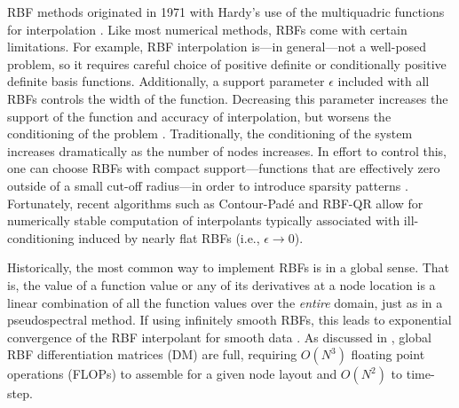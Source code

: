 RBF methods originated in 1971 with Hardy's use of the multiquadric functions for interpolation \cite{Hardy1971}. Like most numerical methods, RBFs come with certain
limitations. For example, RBF interpolation is---in general---not a well-posed
problem, so it requires careful choice of positive definite or conditionally
positive definite basis functions. %
Additionally, a support parameter $\epsilon$ included with all RBFs controls the width of the function. Decreasing this parameter increases the support of the function and accuracy of interpolation, but worsens the conditioning of the problem \cite{Schaback1995}. Traditionally, the conditioning of the system increases dramatically as the number of
nodes increases. In effort to control this, one can choose RBFs with
compact support---functions that are effectively zero outside of a small
cut-off radius---in order to introduce sparsity patterns \cite{Fasshauer2007}. 
Fortunately, recent algorithms such as Contour-Pad\'{e} \cite{Fornberg2004} and RBF-QR \cite{Fornberg2011a} allow for numerically stable computation of interpolants typically associated with ill-conditioning induced by nearly flat RBFs (i.e., $\epsilon \rightarrow 0$). 

Historically, the most common way to implement RBFs is in a global sense. That is, the value of a function value or any of its derivatives 
at a node location is a linear combination of all the function values over the \textit{entire} domain, just as in a pseudospectral method. If using infinitely smooth RBFs, this leads to exponential convergence of the RBF interpolant for smooth data \cite{Fornberg2005}. %
As discussed in \cite{FlyerWright09}, global RBF differentiation matrices (DM) are full, requiring $O(N^3)$ floating point operations (FLOPs) to assemble for a given node layout and $O(N^2)$ to time-step.


